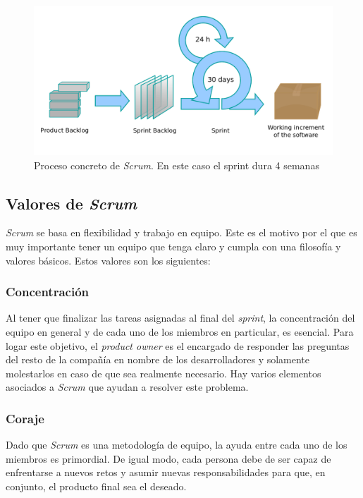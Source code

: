 \begin{figure}[H]
		\includegraphics[width=\textwidth,height=\textheight,keepaspectratio]{./img/scrumprocess.png}
	\caption{Proceso concreto de \textit{Scrum}. En este caso el sprint dura 4 semanas}
	\label{fig:scrumproceso}
\end{figure}

\subsection{Valores de \textit{Scrum}}

\textit{Scrum} se basa en flexibilidad y trabajo en equipo. Este es el motivo por el que es muy importante tener un equipo que tenga claro y cumpla con una filosofía y valores básicos. Estos valores son los siguientes:

\subsubsection{Concentración}

Al tener que finalizar las tareas asignadas al final del \textit{sprint}, la concentración del equipo en general y de cada uno de los miembros en particular, es esencial. Para logar este objetivo, el \textit{product owner} es el encargado de responder las preguntas del resto de la compañía en nombre de los desarrolladores y solamente molestarlos en caso de que sea realmente necesario. Hay varios elementos asociados a \textit{Scrum} que ayudan a resolver este problema.

\subsubsection{Coraje}

Dado que \textit{Scrum} es una metodología de equipo, la ayuda entre cada uno de los miembros es primordial. De igual modo, cada persona debe de ser capaz de enfrentarse a nuevos retos y asumir nuevas responsabilidades para que, en conjunto, el producto final sea el deseado. 

